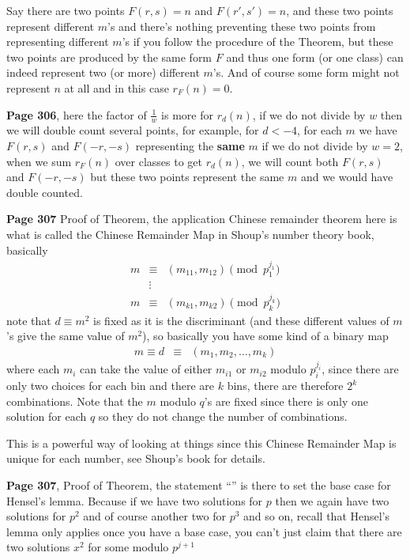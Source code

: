 \documentclass[aps,preprint,preprintnumbers,nofootinbib,showpacs,prd]{revtex4-1}
\newcommand{\nbea}{\begin{eqnarray*}}
\newcommand{\neea}{\end{eqnarray*}}
\begin{document}
Say there are two points $F(r,s) = n$ and $F(r',s') = n$, and these two points represent different $m$'s and there's nothing preventing these two points from representing different $m$'s if you follow the procedure of the Theorem, but these two points are produced by the same form $F$ and thus one form (or one class) can indeed represent two (or more) different $m$'s. And of course some form might not represent $n$ at all and in this case $r_F(n) = 0$.

{\bf Page 306}, here the factor of $\frac{1}{w}$ is more for $r_d(n)$, if we do not divide by $w$ then we will double count several points, for example, for $d < -4$, for each $m$ we have $F(r,s)$ and $F(-r,-s)$ representing the {\bf same} $m$ if we do not divide by $w=2$, when we sum $r_F(n)$ over classes to get $r_d(n)$, we will count both $F(r,s)$ and $F(-r,-s)$ but these two points represent the same $m$ and we would have double counted.

{\bf Page 307} Proof of Theorem, the application Chinese remainder theorem here is what is called the Chinese Remainder Map in Shoup's number theory book, basically
%
\nbea
m & \equiv & (m_{11},m_{12}) \pmod{p_1^{j_1}} \\
 & \vdots & \\
m & \equiv & (m_{k1},m_{k2}) \pmod{p_k^{j_k}}
\neea
%
note that $d \equiv m^2$ is fixed as it is the discriminant (and these different values of $m$'s give the same value of $m^2$), so basically you have some kind of a binary map
%
\nbea
m \equiv d & \equiv & (m_1, m_2, \ldots, m_k)
\neea
%
where each $m_i$ can take the value of either $m_{i1}$ or $m_{i2}$ modulo $p_i^{j_i}$, since there are only two choices for each bin and there are $k$ bins, there are therefore $2^k$ combinations. Note that the $m$ modulo $q$'s are fixed since there is only one solution for each $q$ so they do not change the number of combinations.

This is a powerful way of looking at things since this Chinese Remainder Map is unique for each number, see Shoup's book for details.

{\bf Page 307}, Proof of Theorem, the statement ``'' is there to set the base case for Hensel's lemma. Because if we have two solutions for $p$ then we again have two solutions for $p^2$ and of course another two for $p^3$ and so on, recall that Hensel's lemma only applies once you have a base case, you can't just claim that there are two solutions $x^2$ for some modulo $p^{j+1}$
\end{document}
